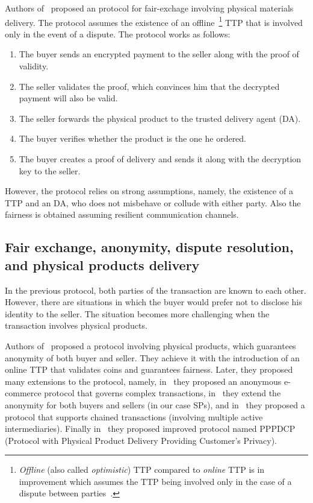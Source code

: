 Authors of~\cite{mohammedalarajFairnessPhysicalProducts2012} proposed an protocol for fair-exchage involving physical materials delivery. The protocol assumes the existence of an offline~\footnote{\textit{Offline} (also called \textit{optimistic}) TTP compared to \textit{online} TTP is in improvement which assumes the TTP being involved only in the case of a dispute between parties~\cite{rayFairExchangeEcommerce2002}.} TTP that is involved only in the event of a dispute. The protocol works as follows: 
\begin{enumerate}
\item The buyer sends an encrypted payment to the seller along with the proof of validity.
\item The seller validates the proof, which convinces him that the decrypted payment will also be valid.
\item The seller forwards the physical product to the trusted delivery agent (DA).
\item The buyer verifies whether the product is the one he ordered.
\item The buyer creates a proof of delivery and sends it along with the decryption key to the seller.
\end{enumerate}

However, the protocol relies on strong assumptions, namely, the existence of a TTP and an DA, who does not misbehave or collude with either party. Also the fairness is obtained assuming resilient communication channels.

\subsection{Fair exchange, anonymity, dispute resolution, and physical products delivery} 
\label{anonymity-and-fair-exchange-in-e-commerce-protocol-for-physical-products-delivery}

In the previous protocol, both parties of the transaction are known to each other. However, there are situations in which the buyer would prefer not to disclose his identity to the seller. The situation becomes more challenging when the transaction involves physical products.

Authors of~\cite{birjoveanuAnonymityFairexchangeEcommerce2015} proposed a protocol involving physical products, which guarantees anonymity of both buyer and seller. They achieve it with the introduction of an online TTP that validates coins and guarantees fairness. Later, they proposed many extensions to the protocol, namely, in~\cite{birjoveanuPreservingAnonymityFair2018} they proposed an anonymous e-commerce protocol that governs complex transactions, in~\cite{birjoveanuAnonymityComplexTransactions2019} they extend the anonymity for both buyers and sellers (in our case SPs), and in~\cite{birjoveanuFairExchangeECommerce2020} they proposed a protocol that supports chained transactions (involving multiple active intermediaries). Finally in~\cite{birjoveanuTwoPartyECommerceProtocols2022} they proposed improved protocol named PPPDCP (Protocol with Physical Product Delivery Providing Customer's Privacy).

